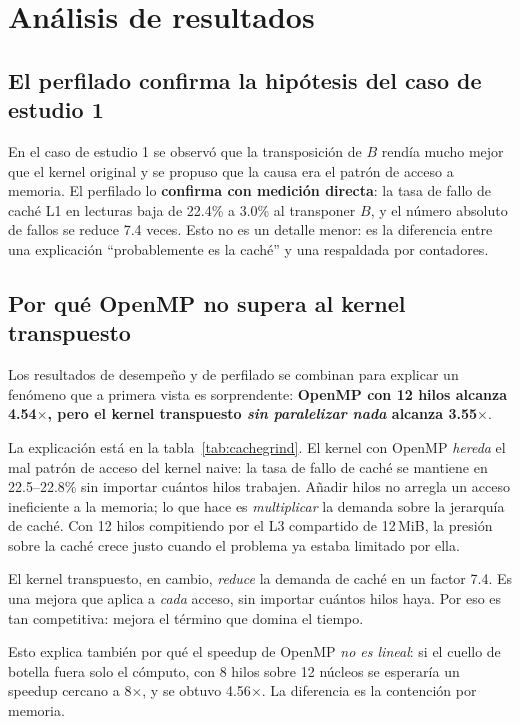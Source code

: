 \section{Análisis de resultados}

\subsection{El perfilado confirma la hipótesis del caso de estudio 1}

En el caso de estudio 1 se observó que la transposición de $B$ rendía mucho mejor que el kernel original y se propuso que la causa era el patrón de acceso a memoria. El perfilado lo \textbf{confirma con medición directa}: la tasa de fallo de caché L1 en lecturas baja de 22.4\% a 3.0\% al transponer $B$, y el número absoluto de fallos se reduce 7.4 veces. Esto no es un detalle menor: es la diferencia entre una explicación ``probablemente es la caché'' y una respaldada por contadores.

\subsection{Por qué OpenMP no supera al kernel transpuesto}

Los resultados de desempeño y de perfilado se combinan para explicar un fenómeno que a primera vista es sorprendente: \textbf{OpenMP con 12 hilos alcanza 4.54$\times$, pero el kernel transpuesto \emph{sin paralelizar nada} alcanza 3.55$\times$}.

La explicación está en la tabla~\ref{tab:cachegrind}. El kernel con OpenMP \emph{hereda} el mal patrón de acceso del kernel naive: la tasa de fallo de caché se mantiene en 22.5--22.8\% sin importar cuántos hilos trabajen. Añadir hilos no arregla un acceso ineficiente a la memoria; lo que hace es \emph{multiplicar} la demanda sobre la jerarquía de caché. Con 12 hilos compitiendo por el L3 compartido de 12\,MiB, la presión sobre la caché crece justo cuando el problema ya estaba limitado por ella.

El kernel transpuesto, en cambio, \emph{reduce} la demanda de caché en un factor 7.4. Es una mejora que aplica a \emph{cada} acceso, sin importar cuántos hilos haya. Por eso es tan competitiva: mejora el término que domina el tiempo.

Esto explica también por qué el speedup de OpenMP \emph{no es lineal}: si el cuello de botella fuera solo el cómputo, con 8 hilos sobre 12 núcleos se esperaría un speedup cercano a 8$\times$, y se obtuvo 4.56$\times$. La diferencia es la contención por memoria.

